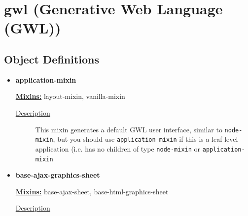 \documentclass [11pt]{book}
\begin{document}
\section{gwl (Generative Web Language (GWL))}

\label{sec:gwl(generativeweblanguage(gwl))}





\subsection{Object Definitions}

\label{subsec:objectdefinitions}



\begin{itemize}

\item {}
\label{prim:application-mixin}
\textbf{application-mixin}


\textbf{
\underline{Mixins:}} layout-mixin, vanilla-mixin





\begin{description}

\item [
\underline{Description}]


This mixin generates a default GWL user interface, similar to \texttt{node-mixin}, but you should use
\texttt{application-mixin} if this is a leaf-level application (i.e. has no children of type \texttt{node-mixin}
or \texttt{application-mixin}



\end{description}









\item {}
\label{prim:base-ajax-graphics-sheet}
\textbf{base-ajax-graphics-sheet}


\textbf{
\underline{Mixins:}} base-ajax-sheet, base-html-graphics-sheet





\begin{description}

\item [
\underline{Description}]



\end{description}
\end{itemize}
\end{document}
